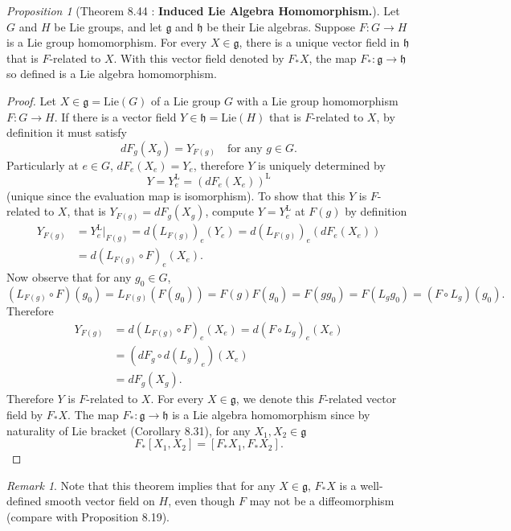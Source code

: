 \documentclass[a4paper]{article}
\theoremstyle{remark}
\newtheorem*{remark}{Remark}
\newtheorem{prop}{Proposition}
\newcommand{\glie}{\mathfrak{g}} %
\newcommand{\hlie}{\mathfrak{h}} %
\newcommand{\Ltegak}{\text{L}} %
\begin{document}
\begin{prop}[Theorem 8.44 : \textbf{Induced Lie Algebra Homomorphism.}]
Let $G$ and $H$ be Lie groups, and let $\glie$ and $\hlie$ be their Lie algebras. Suppose $F : G \to H$ is a Lie group homomorphism. For every $X \in \glie$, there is a unique vector field in $\hlie$ that is $F$-related to $X$. With this vector field denoted by $F_*X$, the map $F_* : \glie \to \hlie$ so defined is a Lie algebra homomorphism.
\end{prop}
\begin{proof}
Let $X \in \glie = \text{Lie}(G)$ of a Lie group $G$ with a Lie group homomorphism $F : G \to H$. If there is a vector field $Y \in \hlie = \text{Lie}(H)$ that is $F$-related to $X$, by definition it must satisfy
$$
dF_g(X_g) = Y_{F(g)} \quad \text{for any }g \in G.
$$
Particularly at $e \in G$, $dF_e(X_e) = Y_e$, therefore $Y$ is uniquely determined by
$$
Y = Y_e^{\Ltegak} = (dF_e(X_e))^{\Ltegak}
$$
(unique since the evaluation map is isomorphism).
To show that this $Y$ is $F$-related to $X$, that is $Y_{F(g)} = dF_g(X_g)$, compute $Y=Y^{\Ltegak}_e$ at $F(g)$ by definition
\begin{align*}
Y_{F(g)} &= Y_e^{\Ltegak}|_{F(g)} = d(L_{F(g)})_e(Y_e) = d(L_{F(g)})_e(dF_e(X_e)) \\ &= d(L_{F(g)} \circ F)_e (X_e).
\end{align*}
Now observe that for any $g_0 \in G$,
$$
(L_{F(g)} \circ F)(g_0) = L_{F(g)} (F(g_0)) = F(g)F(g_0) = F(gg_0) = F (L_g g_0) = (F \circ L_g)(g_0).
$$
Therefore
\begin{align*}
Y_{F(g)} &= d(L_{F(g)} \circ F)_e (X_e) = d(F \circ L_g)_e (X_e) \\
&= (dF_g \circ d(L_g)_e)(X_e) \\
&= dF_g(X_g). 
\end{align*}
Therefore $Y$ is $F$-related to $X$. For every $X \in \glie$, we denote this $F$-related vector field by $F_*X$. The map $F_* : \glie \to \hlie$ is a Lie algebra homomorphism since by naturality of Lie bracket (Corollary 8.31), for any $X_1,X_2 \in \glie$
$$
F_*[X_1,X_2] = [F_*X_1,F_*X_2].
$$ 
\end{proof}
\begin{remark}
Note that this theorem implies that for any $X \in \glie$, $F_*X$ is a well-defined smooth vector field on $H$, even though $F$ may not be a diffeomorphism (compare with Proposition 8.19).
\end{remark}
\end{document}
